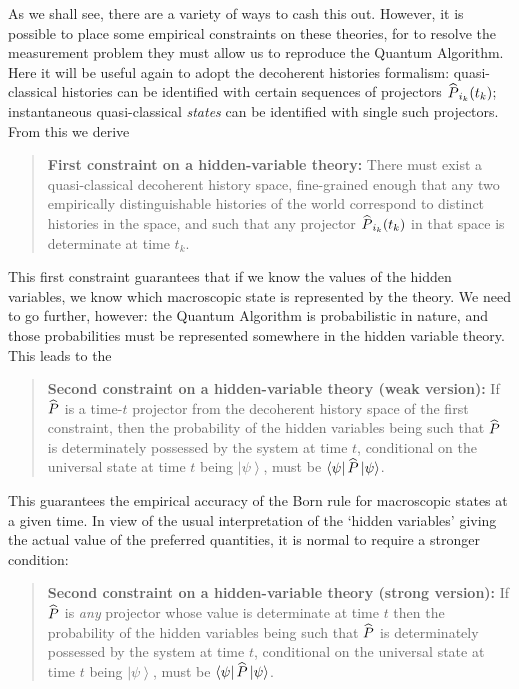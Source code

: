 \documentclass[12pt]{article}
\newcommand{\ket}[1]{\ensuremath{\left|  #1 \right\rangle}}
\newcommand{\bra}[1]{\ensuremath{\left\langle #1 \right|}}
\newcommand{\matel}[3]{\ensuremath{\bra{#1} #2 \ket{#3}}}
\newcommand{\op}[1]{\ensuremath{\widehat{\textsf{\ensuremath{#1}}}}}
\begin{document}
As we shall see, there are a variety of ways to cash this out. However, it is possible to place some empirical constraints on these theories, for to resolve the measurement problem they must allow us to reproduce the Quantum Algorithm. Here it will be useful again to adopt the decoherent histories formalism: quasi-classical histories can be identified with certain sequences of projectors $\op{P}_{i_k}(t_k)$; instantaneous quasi-classical \emph{states} can be identified with single such projectors. From this we derive
\begin{quote}\textbf{First constraint on a hidden-variable theory:} There must exist a quasi-classical decoherent history space, fine-grained enough that any two empirically distinguishable histories of the world correspond to distinct histories in the space, and such that any projector $\op{P}_{i_k}(t_k)$ in that space is determinate at time $t_k$.
\end{quote}
This first constraint guarantees that if we know the values of the hidden variables, we know which macroscopic state is represented by the theory. We need to go further, however: the Quantum Algorithm is probabilistic in nature, and those probabilities must be represented somewhere in the hidden variable theory. This leads to the
\begin{quote}
\textbf{Second constraint on a hidden-variable theory (weak version):} If $\op{P}$ is a time-$t$ projector from the decoherent history space of the first constraint, then the probability of the hidden variables being such that  $\op{P}$ is determinately possessed by the system at time $t$, conditional on the universal state at time $t$ being \ket{\psi}, must be $\matel{\psi}{\op{P}}{\psi}$.
\end{quote}
This guarantees the empirical accuracy of the Born rule for macroscopic states at a given time. In view of the usual interpretation of the `hidden variables' giving the actual value of the preferred quantities, it is normal to require a stronger condition:
\begin{quote}
\textbf{Second constraint on a hidden-variable theory (strong version):} If $\op{P}$ is \emph{any} projector whose value is determinate at time $t$ then the probability of the hidden variables being such that  $\op{P}$ is determinately possessed by the system at time $t$, conditional on the universal state at time $t$ being \ket{\psi}, must be $\matel{\psi}{\op{P}}{\psi}$.
\end{quote}
\end{document}
